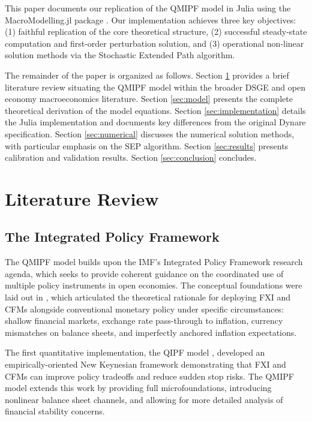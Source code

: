 \documentclass[12pt]{article}
\begin{document}
This paper documents our replication of the QMIPF model in Julia using the MacroModelling.jl package \citep{MacroModellingJL}. Our implementation achieves three key objectives: (1) faithful replication of the core theoretical structure, (2) successful steady-state computation and first-order perturbation solution, and (3) operational non-linear solution methods via the Stochastic Extended Path algorithm.

The remainder of the paper is organized as follows. Section \ref{sec:literature} provides a brief literature review situating the QMIPF model within the broader DSGE and open economy macroeconomics literature. Section \ref{sec:model} presents the complete theoretical derivation of the model equations. Section \ref{sec:implementation} details the Julia implementation and documents key differences from the original Dynare specification. Section \ref{sec:numerical} discusses the numerical solution methods, with particular emphasis on the SEP algorithm. Section \ref{sec:results} presents calibration and validation results. Section \ref{sec:conclusion} concludes.

\section{Literature Review}\label{sec:literature}

\subsection{The Integrated Policy Framework}

The QMIPF model builds upon the IMF's Integrated Policy Framework research agenda, which seeks to provide coherent guidance on the coordinated use of multiple policy instruments in open economies. The conceptual foundations were laid out in \citet{adrian2020conceptual}, which articulated the theoretical rationale for deploying FXI and CFMs alongside conventional monetary policy under specific circumstances: shallow financial markets, exchange rate pass-through to inflation, currency mismatches on balance sheets, and imperfectly anchored inflation expectations.

The first quantitative implementation, the QIPF model \citep{adrian2020quantitative}, developed an empirically-oriented New Keynesian framework demonstrating that FXI and CFMs can improve policy tradeoffs and reduce sudden stop risks. The QMIPF model \citep{adrian2021quantitative} extends this work by providing full microfoundations, introducing nonlinear balance sheet channels, and allowing for more detailed analysis of financial stability concerns.
\end{document}
